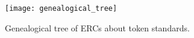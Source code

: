 \begin{figure}[!htbp]
\centering
\texttt{[image: genealogical\_tree]}
\caption{Genealogical tree of ERCs about token standards.}
\label{fig:genealogicaltree}
\end{figure}
